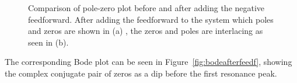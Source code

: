 \begin{figure}[h!]
  \centering %
  \qquad
  \caption{\label{fig:negfeedpzmap} Comparison of pole-zero plot before and after adding the negative feedforward. After adding the feedforward to the system which poles and zeros are shown in (a) , the zeros and poles are interlacing as seen in (b).}
\end{figure}
\FloatBarrier
The corresponding Bode plot can be seen in Figure~\ref{fig:bodeafterfeedf}, showing the complex conjugate pair of zeros as a dip before the first resonance peak.

